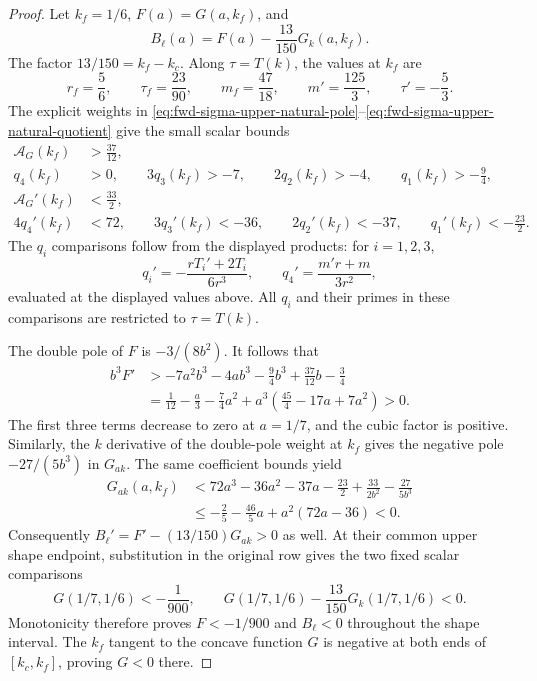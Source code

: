 \begin{proof}
Let $k_f=1/6$, $F(a)=G(a,k_f)$, and
\[
 B_\ell(a)=F(a)-\frac{13}{150}G_k(a,k_f).
\]
The factor $13/150=k_f-k_c$. Along $\tau=T(k)$, the
values at $k_f$ are
\[
 r_f=\frac56,\qquad \tau_f=\frac{23}{90},\qquad
 m_f=\frac{47}{18},\qquad m'=\frac{125}3,\qquad \tau'=-\frac53.
\]
The explicit weights in
\eqref{eq:fwd-sigma-upper-natural-pole}--\eqref{eq:fwd-sigma-upper-natural-quotient}
give the small scalar bounds
\begin{align*}
 \mathcal A_G(k_f)&>\frac{37}{12},\\
 q_4(k_f)&>0,\qquad 3q_3(k_f)>-7,\qquad
 2q_2(k_f)>-4,\qquad q_1(k_f)>-\frac94,\\
 \mathcal A_G'(k_f)&<\frac{33}2,\\
 4q_4'(k_f)&<72,\qquad3q_3'(k_f)<-36,\qquad
 2q_2'(k_f)<-37,\qquad q_1'(k_f)<-\frac{23}2.
\end{align*}
The $q_i$ comparisons follow from the displayed products:
for $i=1,2,3$,
\[
 q_i'= -\frac{rT_i'+2T_i}{6r^3},\qquad
 q_4'=\frac{m'r+m}{3r^2},
\]
evaluated at the displayed values above. All $q_i$ and their primes
in these comparisons are restricted to $\tau=T(k)$.

The double pole of $F$ is $-3/(8b^2)$. It follows that
\begin{align*}
 b^3F'
 &>-7a^2b^3-4ab^3-\frac94b^3+\frac{37}{12}b-\frac34\\
 &=\frac1{12}-\frac a3-\frac74a^2
      +a^3\left(\frac{45}4-17a+7a^2\right)>0.
\end{align*}
The first three terms decrease to zero at $a=1/7$, and the cubic
factor is positive. Similarly, the $k$ derivative of the double-pole
weight at $k_f$ gives the negative pole $-27/(5b^3)$ in $G_{ak}$.
The same coefficient bounds yield
\begin{align*}
 G_{ak}(a,k_f)
 &<72a^3-36a^2-37a-\frac{23}2
                +\frac{33}{2b^2}-\frac{27}{5b^3}\\
 &\leq-\frac25-\frac{46}5a+a^2(72a-36)<0.
\end{align*}
Consequently $B_\ell'=F'-(13/150)G_{ak}>0$ as well.
At their common upper shape endpoint, substitution in the original row
gives the two fixed scalar comparisons
\begin{equation}\label{eq:fwd-sigma-upper-fixed-tangent}
 G(1/7,1/6)<-\frac1{900},\qquad
 G(1/7,1/6)-\frac{13}{150}G_k(1/7,1/6)<0.
\end{equation}
Monotonicity therefore proves $F<-1/900$ and $B_\ell<0$ throughout
the shape interval. The $k_f$ tangent to the concave function $G$ is
negative at both ends of $[k_c,k_f]$, proving $G<0$ there.


\end{proof}
